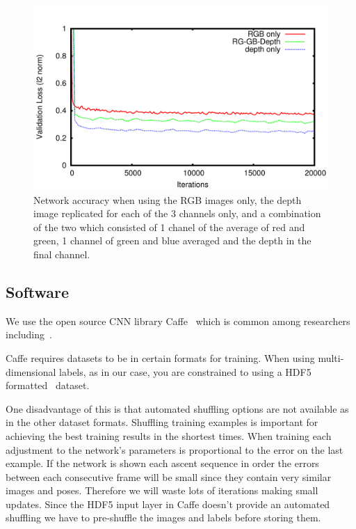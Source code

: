 \documentclass[11pt]{article} %
\begin{document}
\begin{figure}
\includegraphics*[width=0.9\linewidth,clip]{rgbComp.pdf} %
\caption{Network accuracy when using the RGB images only, the depth image replicated for each of the 3 channels only, and a combination of the two which consisted of 1 chanel of the average of red and green, 1 channel of green and blue averaged and the depth in the final channel. }
\label{fig:rgbdcomp}
\end{figure}





\subsection{Software}

We use the open source CNN library Caffe~\cite{Jia2014} which is common among researchers including~\cite{Chen, Pfister,Girshick2014,Springenberg2015,Schwarz2015,Simonyan2015,Wang2015}. 

Caffe requires datasets to be in certain formats for training. When using multi-dimensional labels, as in our case, you are constrained to using a HDF5 formatted~\cite{Folk2011} dataset. 

One disadvantage of this is that automated shuffling options are not available as in the other dataset formats. Shuffling training examples is important for achieving the best training results in the shortest times. When training each adjustment to the network's parameters is proportional to the error on the last example. If the network is shown each ascent sequence in order the errors between each consecutive frame will be small since they contain very similar images and poses. Therefore we will waste lots of iterations making small updates. Since the HDF5 input layer in Caffe doesn't provide an automated shuffling we have to pre-shuffle the images and labels before storing them.
\end{document}
